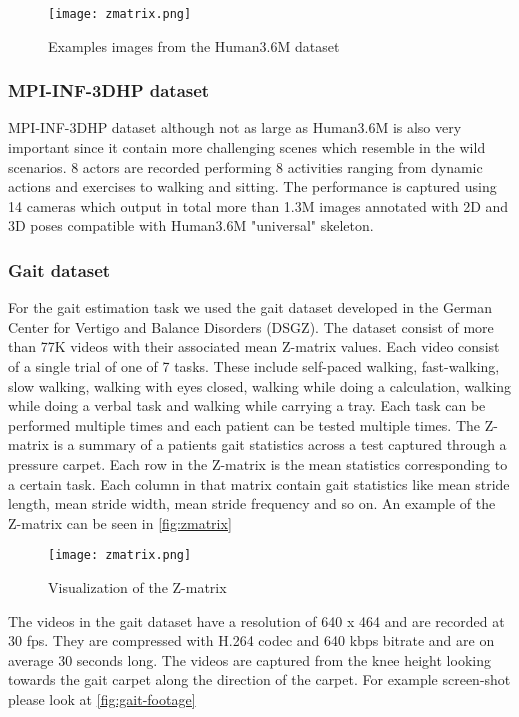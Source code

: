 \begin{figure}[htpb]
    \texttt{[image: zmatrix.png]}
    \caption{Examples images from the Human3.6M dataset\parencite{ionescu2014human3}}
    \label{fig:human3.6M}
\end{figure}

\subsubsection{MPI-INF-3DHP dataset}

MPI-INF-3DHP dataset although not as large as Human3.6M is also very important since it contain more challenging scenes which resemble in the wild scenarios. 8 actors are recorded performing 8 activities ranging from dynamic actions and exercises to walking and sitting. The performance is captured using 14 cameras which output in total more than 1.3M images annotated with 2D and 3D poses compatible with Human3.6M "universal" skeleton.

\subsubsection{Gait dataset}

For the gait estimation task we used the gait dataset developed in the German Center for Vertigo and Balance Disorders (DSGZ). The dataset consist of more than 77K videos with their associated mean Z-matrix values. Each video consist of a single trial of one of 7 tasks. These include self-paced walking, fast-walking, slow walking, walking with eyes closed, walking while doing a calculation, walking while doing a verbal task and walking while carrying a tray. Each task can be performed multiple times and each patient can be tested multiple times. The Z-matrix is a summary of a patients gait statistics across a test captured through a pressure carpet. Each row in the Z-matrix is the mean statistics corresponding to a certain task. Each column in that matrix contain gait statistics like mean stride length, mean stride width, mean stride frequency and so on. An example of the Z-matrix can be seen in \autoref{fig:zmatrix}

\begin{figure}[htpb]
    \texttt{[image: zmatrix.png]}
    \caption{Visualization of the Z-matrix}
    \label{fig:zmatrix}
\end{figure}
  

The videos in the gait dataset have a resolution of 640 x 464 and are recorded at 30 fps. They are compressed with H.264 codec and 640 kbps bitrate and are on average 30 seconds long. The videos are captured from the knee height looking towards the gait carpet along the direction of the carpet. For example screen-shot please look at \autoref{fig:gait-footage}

